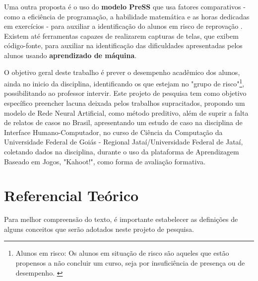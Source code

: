 \documentclass[
	12pt,				%
	openright,			%
	oneside,
	a4paper,			%
	english,			%
	french,				%
	spanish,			%
	brazil,				%
	]{abntex2}
\begin{document}
 Uma outra proposta é o uso do \textbf{modelo PreSS} que usa fatores comparativos - como a eficiência de programação, a habilidade matemática  e as horas dedicadas em exercícios - para auxiliar a identificação do alunos em risco de reprovação \cite{quille2018}. Existem até ferramentas capazes de realizarem capturas de telas, que exibem código-fonte, para auxiliar na identificação das dificuldades apresentadas pelos alunos usando \textbf{aprendizado de máquina}\cite{ahadi2016early}.
 
O objetivo geral deste trabalho é prever o desempenho acadêmico dos alunos, ainda no inicio da disciplina, identificando os que estejam no "grupo de risco"\footnote[3]{Alunos em risco: Os alunos em situação de risco são aqueles que estão propensos a não concluir um curso, seja por insuficiência de presença ou de desempenho. \cite{da2014alunos}}, possibilitando ao professor intervir. Este projeto de pesquisa tem como objetivo específico preencher lacuna deixada pelos trabalhos supracitados, propondo um modelo de Rede Neural Artificial, como método preditivo, além de suprir a falta de relatos de casos no Brasil, apresentando um estudo de caso na disciplina de Interface Humano-Computador, no curso de Ciência da Computação da Universidade Federal de Goiás - Regional Jataí/Universidade Federal de Jataí, coletando dados na disciplina, durante o uso da plataforma de Aprendizagem Baseado em Jogos, "Kahoot!", como forma de avaliação formativa.


\chapter{Referencial Teórico}
Para melhor compreensão do texto, é importante estabelecer as definições de alguns conceitos que serão adotados neste projeto de pesquisa. 
\end{document}
